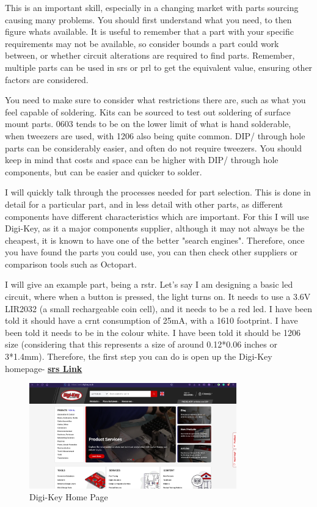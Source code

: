 \documentclass[a4paper,11pt]{report}
\let\oldhref\href %
\renewcommand{\href}[2]{\oldhref{#1}{\bf\gls{srs} #2}}
\begin{document}
This is an important skill, especially in a changing market with parts sourcing causing many problems. You should first understand what you need, to then figure whats available. It is useful to remember that a part with your specific requirements may not be available, so consider bounds a part could work between, or whether circuit alterations are required to find parts. Remember, multiple parts can be used in \gls{srs} or \gls{prl} to get the equivalent value, ensuring other factors are considered.

You need to make sure to consider what restrictions there are, such as what you feel capable of soldering. Kits can be sourced to test out soldering of surface mount parts. 0603 tends to be on the lower limit of what is hand solderable, when tweezers are used, with 1206 also being quite common. DIP/ through hole parts can be considerably easier, and often do not require tweezers. You should keep in mind that costs and space can be higher with DIP/ through hole components, but can be easier and quicker to solder.

I will quickly talk through the processes needed for part selection. This is done in detail for a particular part, and in less detail with other parts, as different components have different characteristics which are important. For this I will use Digi-Key, as it a major components supplier, although it may not always be the cheapest, it is known to have one of the better "search engines". Therefore, once you have found the parts you could use, you can then check other suppliers or comparison tools such as Octopart.

I will give an example part, being a \gls{rstr}. Let's say I am designing a basic \gls{led} circuit, where when a button is pressed, the light turns on. It needs to use a 3.6V LIR2032 (a small rechargeable coin cell), and it needs to be a red \gls{led}. I have been told it should have a \gls{crnt} consumption of 25mA, with a  1610 footprint. I have been told it needs to be in the colour white. I have been told it should be 1206 size (considering that this represents a size of around 0.12*0.06 inches or 3*1.4mm).
Therefore, the first step you can do is open up the Digi-Key homepage- \href{https://www.DigiKey.co.uk/}{Link}

\begin{figure}[H]
\centering
\includegraphics[width=0.8\textwidth]{screenshots/DigiKeyHome}
\caption{Digi-Key Home Page}
\end{figure}
\end{document}
